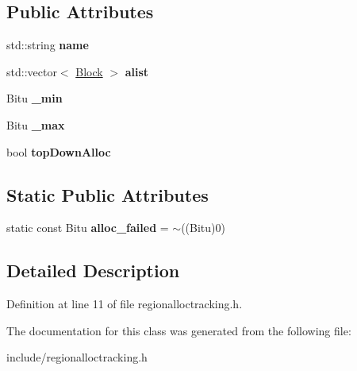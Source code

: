 \subsection*{Public Attributes}
\begin{DoxyCompactItemize}
\item 
\hypertarget{classRegionAllocTracking_a1fcd5cfce8e215f77331e90e220da0f5}{std\-::string {\bfseries name}}\label{classRegionAllocTracking_a1fcd5cfce8e215f77331e90e220da0f5}

\item 
\hypertarget{classRegionAllocTracking_ac06d694e674c27bb3272f56401075d6e}{std\-::vector$<$ \hyperlink{classRegionAllocTracking_1_1Block}{Block} $>$ {\bfseries alist}}\label{classRegionAllocTracking_ac06d694e674c27bb3272f56401075d6e}

\item 
\hypertarget{classRegionAllocTracking_adf0b9d0fc7b2ed4b80fb3084b3b17739}{Bitu {\bfseries \-\_\-min}}\label{classRegionAllocTracking_adf0b9d0fc7b2ed4b80fb3084b3b17739}

\item 
\hypertarget{classRegionAllocTracking_aaf5ecc163636a2c3fa6fdd84358e0df4}{Bitu {\bfseries \-\_\-max}}\label{classRegionAllocTracking_aaf5ecc163636a2c3fa6fdd84358e0df4}

\item 
\hypertarget{classRegionAllocTracking_ae9c6f713758966d53bb1e2dcc5a4aab2}{bool {\bfseries top\-Down\-Alloc}}\label{classRegionAllocTracking_ae9c6f713758966d53bb1e2dcc5a4aab2}

\end{DoxyCompactItemize}
\subsection*{Static Public Attributes}
\begin{DoxyCompactItemize}
\item 
\hypertarget{classRegionAllocTracking_a4763aa8e3a86fab24189802bbe87824d}{static const Bitu {\bfseries alloc\-\_\-failed} = $\sim$((Bitu)0)}\label{classRegionAllocTracking_a4763aa8e3a86fab24189802bbe87824d}

\end{DoxyCompactItemize}


\subsection{Detailed Description}


Definition at line 11 of file regionalloctracking.\-h.



The documentation for this class was generated from the following file\-:\begin{DoxyCompactItemize}
\item 
include/regionalloctracking.\-h\end{DoxyCompactItemize}
